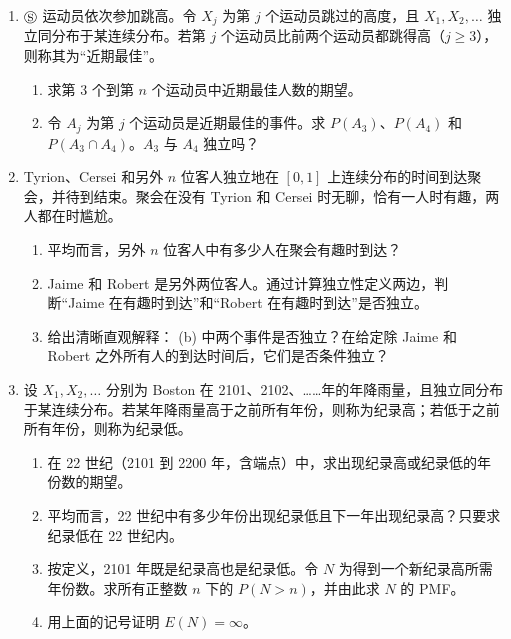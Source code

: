 \documentclass[UTF8, 12pt, fontset=fandol, oneside]{ctexart}
\begin{document}
\begin{enumerate}
  \item $\circledS$ 运动员依次参加跳高。令 $X_j$ 为第 $j$ 个运动员跳过的高度，且 $X_1,X_2,\ldots$ 独立同分布于某连续分布。若第 $j$ 个运动员比前两个运动员都跳得高（$j\ge3$），则称其为“近期最佳”。
  \begin{enumerate}
    \item 求第 $3$ 个到第 $n$ 个运动员中近期最佳人数的期望。
    \item 令 $A_j$ 为第 $j$ 个运动员是近期最佳的事件。求 $P(A_3)$、$P(A_4)$ 和 $P(A_3\cap A_4)$。$A_3$ 与 $A_4$ 独立吗？
  \end{enumerate}

  \item Tyrion、Cersei 和另外 $n$ 位客人独立地在 $[0,1]$ 上连续分布的时间到达聚会，并待到结束。聚会在没有 Tyrion 和 Cersei 时无聊，恰有一人时有趣，两人都在时尴尬。
  \begin{enumerate}
    \item 平均而言，另外 $n$ 位客人中有多少人在聚会有趣时到达？
    \item Jaime 和 Robert 是另外两位客人。通过计算独立性定义两边，判断“Jaime 在有趣时到达”和“Robert 在有趣时到达”是否独立。
    \item 给出清晰直观解释： (b) 中两个事件是否独立？在给定除 Jaime 和 Robert 之外所有人的到达时间后，它们是否条件独立？
  \end{enumerate}

  \item 设 $X_1,X_2,\ldots$ 分别为 Boston 在 2101、2102、……年的年降雨量，且独立同分布于某连续分布。若某年降雨量高于之前所有年份，则称为纪录高；若低于之前所有年份，则称为纪录低。
  \begin{enumerate}
    \item 在 22 世纪（2101 到 2200 年，含端点）中，求出现纪录高或纪录低的年份数的期望。
    \item 平均而言，22 世纪中有多少年份出现纪录低且下一年出现纪录高？只要求纪录低在 22 世纪内。
    \item 按定义，2101 年既是纪录高也是纪录低。令 $N$ 为得到一个新纪录高所需年份数。求所有正整数 $n$ 下的 $P(N>n)$，并由此求 $N$ 的 PMF。
    \item 用上面的记号证明 $E(N)=\infty$。
  \end{enumerate}
\end{enumerate}
\end{document}

